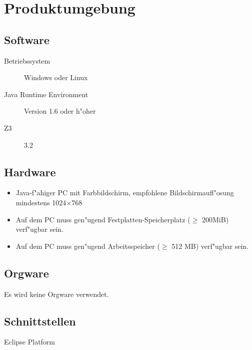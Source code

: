 \section{Produktumgebung}%

\subsection{Software}%

\begin{description}%
    \item [Betriebssystem] \see Windows oder \see Linux%
    \item [\see Java Runtime Environment] Version 1.6 oder h"oher%
    \item [\see Z3] 3.2%
\end{description}%

\subsection{Hardware}%


\begin{itemize}%
    \item \see Java-f"ahiger PC mit Farbbildschirm, empfohlene Bildschirmaufl"osung mindestens 1024$\times$768%
    \item Auf dem PC muss gen"ugend Festplatten-Speicherplatz ($\ge$ 200MiB) verf"ugbar sein.%
    \item Auf dem PC muss gen"ugend Arbeitsspeicher ($\ge$ 512 MB) verf"ugbar sein.%
\end{itemize}%

\subsection{Orgware}%

Es wird keine \see Orgware verwendet.%

\subsection{Schnittstellen}%

\begin{description}%
    \item [\see Eclipse Platform]%
\end{description}%
